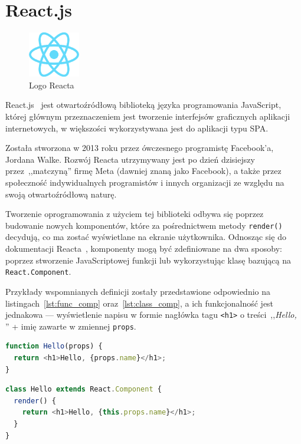 \documentclass[twoside,a4paper]{report}
\begin{document}
\section{React.js}
\begin{figure}
    \centering
    \includegraphics[width=0.2\textwidth]{img/logo_react.png}
    \caption*{Logo Reacta}\label{fig:logo_react}
\end{figure}
React.js~\cite{react} jest otwartoźródłową biblioteką języka programowania JavaScript, której głównym przeznaczeniem jest tworzenie interfejsów graficznych aplikacji internetowych, w większości wykorzystywana jest do aplikacji typu SPA\@.

Została stworzona w 2013 roku przez ówczesnego programistę Facebook'a, Jordana Walke.
Rozwój Reacta utrzymywany jest po dzień dzisiejszy przez~,,matczyną'' firmę Meta (dawniej znaną jako Facebook), a także przez społeczność indywidualnych programistów i innych organizacji ze względu na swoją otwartoźródłową naturę.

Tworzenie oprogramowania z użyciem tej biblioteki odbywa się poprzez budowanie nowych komponentów, które za pośrednictwem metody \texttt{render()} decydują, co ma zostać wyświetlane na ekranie użytkownika.
Odnosząc się do dokumentacji Reacta~\cite{reactdocs}, komponenty mogą być zdefiniowane na dwa sposoby: poprzez stworzenie JavaScriptowej funkcji lub wykorzystując klasę bazującą na \texttt{React.Component}.

Przykłady wspomnianych definicji zostały przedstawione odpowiednio na listingach~\ref{lst:func_comp} oraz~\ref{lst:class_comp}, a ich funkcjonalność jest jednakowa --- wyświetlenie napisu w formie nagłówka tagu \texttt{<h1>} o treści~,,\textit{Hello, }'' + imię zawarte w zmiennej \texttt{props}.

\begin{lstlisting}[caption={Funkcyjny komponent},label={lst:func_comp},language=JavaScript]
function Hello(props) {
  return <h1>Hello, {props.name}</h1>;
}
\end{lstlisting}
\begin{lstlisting}[caption={Klasowy komponent},label={lst:class_comp},language=JavaScript]
class Hello extends React.Component {
  render() {
    return <h1>Hello, {this.props.name}</h1>;
  }
}
\end{lstlisting}
\end{document}
